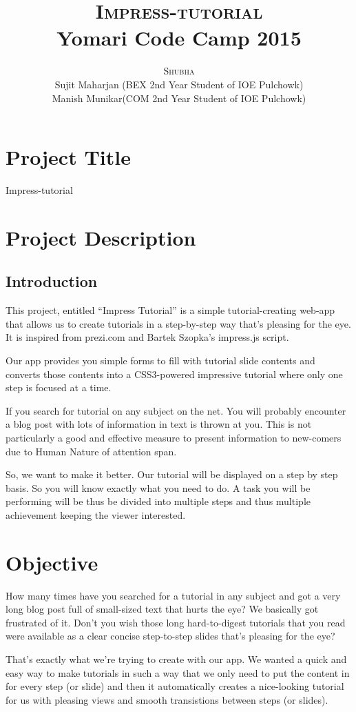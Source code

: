 \documentclass[12pt,a4paper]{article}
\title{
  {\Huge{\textsc{Impress-tutorial}}}\\
  {\Large{Yomari Code Camp 2015}}
}
\author{\textsc{Shubha} \\ Sujit Maharjan (BEX 2nd Year Student of IOE Pulchowk) \\ Manish Munikar(COM 2nd Year Student of IOE Pulchowk)}
\begin{document}
\maketitle
\section{Project Title}

Impress-tutorial

\section{Project Description}

\subsection{Introduction}
This project, entitled “Impress Tutorial” is a simple tutorial-creating web-app that allows us to create tutorials in a step-by-step way that's pleasing for the eye. It is inspired from prezi.com and Bartek Szopka's impress.js script.

Our app provides you simple forms to fill with tutorial slide contents and converts those contents into a CSS3-powered impressive tutorial where only one step is focused at a time.


If you search for tutorial on any subject on the net. You will probably encounter a blog post with lots of information in text is thrown at you. This is not particularly a good and effective measure to present information to new-comers due to Human Nature of attention span.

So, we want to make it better. Our tutorial will be displayed on a step by step basis. So you will know exactly what you need to do. A task you will be performing will be thus be divided into multiple steps and thus multiple achievement keeping the viewer interested. 

\section{Objective}

How many times have you searched for a tutorial in any subject and got a very long blog post full of small-sized text that hurts the eye? We basically got frustrated of it. Don't you wish those long hard-to-digest tutorials that you read were available as a clear concise step-to-step slides that's pleasing for the eye?

That's exactly what we're trying to create with our app. We wanted a quick and easy way to make tutorials in such a way that we only need to put the content in for every step (or slide) and then it automatically creates a nice-looking tutorial for us with pleasing views and smooth transistions between steps (or slides).
\end{document}
